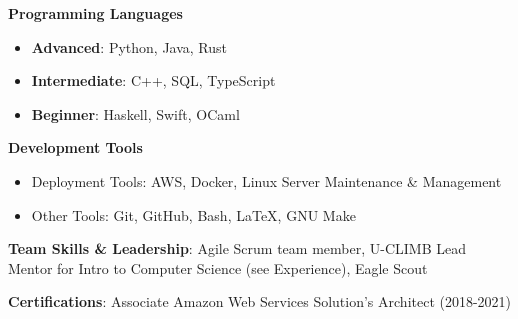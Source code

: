 \vspace{-2.0mm}


\begin{cventries}
\vspace{-5mm}
  \cventry
    {}
    {}
    {}
    {}
    {
      \begin{cvitems}
        \item {\textbf{Programming Languages}}
        \begin{itemize}
        \item \textbf{Advanced}: Python, Java, Rust
        \item \textbf{Intermediate}: C++, SQL, TypeScript
        \ifcv
        \item \textbf{Beginner}: Haskell, Swift, OCaml
        \fi
        \end{itemize}
        \item {\textbf{Development Tools}}
        \begin{itemize}
        \item {Deployment Tools: AWS, Docker, Linux Server Maintenance \& Management}
        \item {Other Tools: Git, GitHub, Bash, \LaTeX, GNU Make}
        \end {itemize}
        \item {\textbf{Team Skills \& Leadership}: Agile Scrum team
            member, U-CLIMB Lead Mentor for Intro to Computer Science (see Experience),
    Eagle Scout}
          \ifcv
          \item {\textbf{Certifications}: Associate Amazon Web Services Solution's Architect (2018-2021)}
          \fi
      \end{cvitems}
    }
    {}
\end{cventries}
